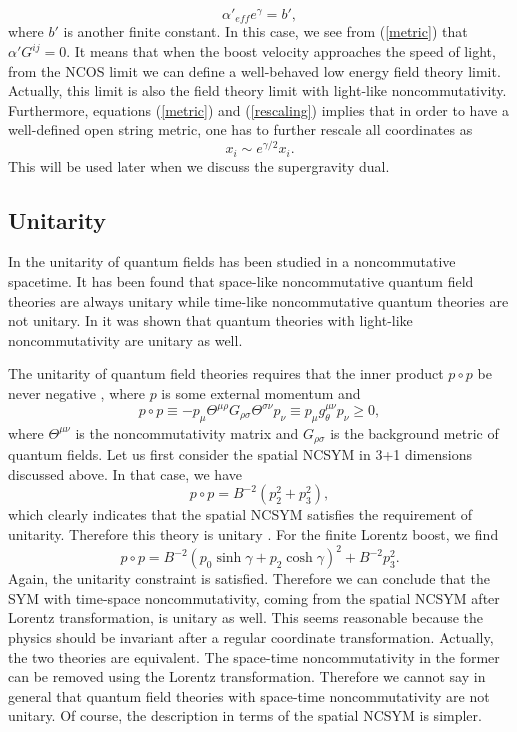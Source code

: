 \documentclass[a4paper,12pt]{article}
\begin{document}
\begin{equation}
\label{rescaling}
\alpha'_{eff}e^{\gamma} =b',
\end{equation}
where $b'$ is another finite constant. In this case, we see from (\ref{metric})
that $ \alpha' G^{ij}=0$. It means that when the boost velocity approaches
the speed of light, from the NCOS limit we can define a well-behaved low energy
field theory limit. Actually, this limit is also the field theory
limit with light-like noncommutativity. Furthermore, equations (\ref{metric})
and (\ref{rescaling}) implies that in order to have a well-defined open string
metric, one has to further rescale all coordinates as
\begin{equation}
x_i \sim e^{\gamma/2}x_i.
\end{equation}
This will be used later when we discuss the supergravity dual.


\subsection{Unitarity}

In \cite{Gomi} the unitarity of quantum fields has been studied in
a noncommutative spacetime. It has been found that space-like
noncommutative quantum field theories are always unitary while time-like
noncommutative quantum theories are not unitary. In \cite{AGM} it was
shown that quantum theories with light-like noncommutativity are unitary
as well.

The unitarity of quantum field theories requires that the inner product
$p\circ p$ be never negative \cite{Gomi,AGM}, where $p$ is some external
momentum and
\begin{equation}
p \circ p \equiv -p_{\mu} \Theta^{\mu \rho} G_{\rho\sigma}\Theta^{\sigma\nu}
 p_{\nu} \equiv p_{\mu} g^{\mu\nu}_{\theta}p_{\nu} \ge 0,
\end{equation}
where $\Theta^{\mu\nu}$ is the noncommutativity matrix and $G_{\rho\sigma}$
is the background metric of quantum fields. Let us first consider the spatial
NCSYM in 3+1 dimensions discussed above. In that case,
we have
\begin{equation}
p \circ p = B^{-2}(p^2_2 +p_3^2),
\end{equation}
which clearly indicates that the spatial NCSYM satisfies the
requirement of unitarity. Therefore this theory is unitary \cite{Gomi}.
For the finite Lorentz boost, we find
\begin{equation}
p\circ p = B^{-2}(p_0 \sinh \gamma +p_2 \cosh\gamma)^2 + B^{-2}p_3^2.
\end{equation}
Again, the unitarity constraint is satisfied. Therefore we can conclude that the
SYM with time-space noncommutativity, coming from the spatial
NCSYM after Lorentz transformation, is unitary as well.
This seems reasonable because the physics should be invariant after a
regular coordinate transformation. Actually, the two theories are equivalent.
The space-time noncommutativity in the former can be removed using the Lorentz
transformation. Therefore we cannot say in general that quantum field theories
with space-time noncommutativity are not unitary. Of course, the description
in terms of the spatial NCSYM is simpler.
\end{document}
